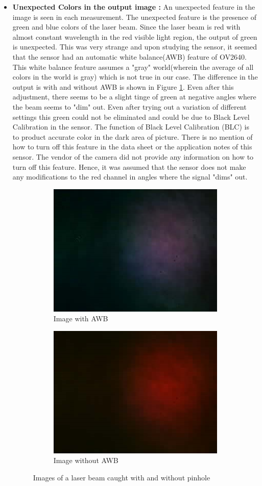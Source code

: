 \begin{itemize}
\item \textbf{Unexpected Colors in the output image :} An unexpected feature in the image is seen in each measurement. The unexpected feature is the presence of green and blue colors of the laser beam. Since the laser beam is red with almost constant wavelength in the red visible light region, the output of green is unexpected. This was very strange and upon studying the sensor, it seemed that the sensor had an automatic white balance(AWB) feature of OV2640. This white balance feature assumes a "gray" world(wherein the average of all colors in the world is gray)\cite{OV2640SoftwareApp} which is not true in our case. The difference in the output is with and without AWB is shown in Figure \ref{fig:AWB}. Even after this adjustment, there seems to be a slight tinge of green at negative angles where the beam seems to "dim" out. Even after trying out a variation of different settings this green could not be eliminated and could be due to Black Level Calibration in the sensor. The function of Black Level Calibration (BLC) is to product accurate color in the dark area of
picture. There is no mention of how to turn off this feature in the data sheet or the application notes of this sensor. The vendor of the camera did not provide any information on how to turn off this feature. Hence, it was assumed that the sensor does not make any modifications to the red channel in angles where the signal "dims" out.
\begin{figure}[ht]
    \begin{subfigure}{0.5\textwidth}
    \centering
        \includegraphics[width=0.5\linewidth]{pics/awb.jpg}
        \caption{Image with AWB}
    \end{subfigure}%
    \begin{subfigure}{0.5\textwidth}
    \centering
        \includegraphics[width=0.5\linewidth]{pics/withoutawb.jpg}
        \caption{Image without AWB}
    \end{subfigure}
    \caption{Images of a laser beam caught with and without pinhole}
    \label{fig:AWB}
    \end{figure}
\end{itemize}
